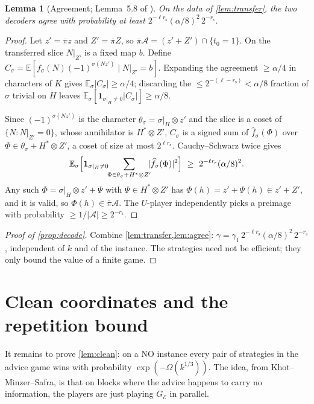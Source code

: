 \documentclass[11pt]{article}
\newtheorem{lemma}[theorem]{Lemma}
\theoremstyle{definition}
\theoremstyle{remark}
\newcommand{\E}{\mathbb E}
\newcommand{\cE}{\mathcal E}
\newcommand{\cA}{\mathcal A}
\newcommand{\rs}{r_{\mathrm s}}
\newcommand{\bpi}{\bar\pi}
\newcommand{\abs}[1]{\lvert #1\rvert}
\begin{document}
\begin{lemma}[Agreement; Lemma~5.8 of \cite{OpenAI-UGC}]\label{lem:agree}
On the data of \cref{lem:transfer}, the two decoders agree with probability
at least $2^{-\ell\rs}(\alpha/8)^2\,2^{-\rs}$.
\end{lemma}

\begin{proof}
Let $z'=\bpi z$ and $Z'=\bpi Z$, so $\bpi\cA=(z'+Z')\cap\{t_0=1\}$. On the
transferred slice $N|_{Z'}$ is a fixed map $b$. Define
$C_\sigma=\E[f_\sigma(N)(-1)^{\sigma(Nz')}\mid N|_{Z'}=b]$. Expanding the
agreement $\ge\alpha/4$ in characters of $K$ gives
$\E_\sigma\abs{C_\sigma}\ge\alpha/4$; discarding the $\le2^{-(\ell-\rs)}<\alpha/8$
fraction of $\sigma$ trivial on $H$ leaves
$\E_\sigma[\mathbf 1_{\sigma|_H\ne0}\abs{C_\sigma}]\ge\alpha/8$.

Since $(-1)^{\sigma(Nz')}$ is the character $\theta_\sigma=\sigma|_H\otimes z'$
and the slice is a coset of $\{N:N|_{Z'}=0\}$, whose annihilator is
$H^*\otimes Z'$, $C_\sigma$ is a signed sum of $\widehat f_\sigma(\Phi)$ over
$\Phi\in\theta_\sigma+H^*\otimes Z'$, a coset of size at most $2^{\ell\rs}$.
Cauchy--Schwarz twice gives
\[
\E_\sigma\Bigl[\mathbf 1_{\sigma|_H\ne0}\!\!\sum_{\Phi\in\theta_\sigma+H^*\otimes Z'}\!\!\abs{\widehat f_\sigma(\Phi)}^2\Bigr]
\ \ge\ 2^{-\ell\rs}(\alpha/8)^2 .
\]
Any such $\Phi=\sigma|_H\otimes z'+\Psi$ with $\Psi\in H^*\otimes Z'$ has
$\Phi(h)=z'+\Psi(h)\in z'+Z'$, and it is valid, so $\Phi(h)\in\bpi\cA$. The
$U$-player independently picks a preimage with probability $\ge1/\abs\cA\ge2^{-\rs}$.
\end{proof}

\begin{proof}[Proof of \cref{prop:decode}]
Combine \cref{lem:transfer,lem:agree}:
$\gamma=\gamma_1\,2^{-\ell\rs}(\alpha/8)^2\,2^{-\rs}$, independent of $k$ and of
the instance. The strategies need not be efficient; they only bound the
value of a finite game.
\end{proof}

\section{Clean coordinates and the repetition bound}\label{sec:clean}

It remains to prove \cref{lem:clean}: on a NO instance every pair of
strategies in the advice game wins with probability $\exp(-\Omega(k^{1/3}))$.
The idea, from Khot--Minzer--Safra, is that on blocks where the advice happens to
carry no information, the players are just playing $G_\cE$ in parallel.
\end{document}
